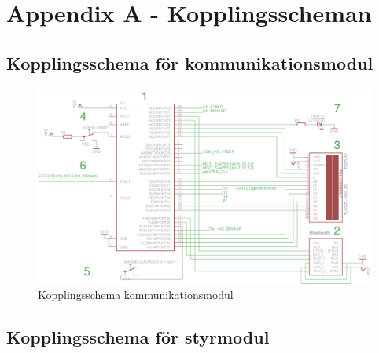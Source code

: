 \documentclass[a4paper,12pt,fleqn]{article}
\begin{document}

\newpage
\appendix
\pagestyle{empty}
\section*{Appendix A - Kopplingsscheman}
\subsection*{Kopplingsschema för kommunikationsmodul}

\begin{figure}[ht] %
  \begin{center}
  \includegraphics[keepaspectratio=true,width=\linewidth]{bilder/Kom_uptodate.png}  %
  \end{center}
  \caption{Kopplingsschema kommunikationsmodul} %
  \label{fig:kopplingkom} %
\end{figure}
 \clearpage %
 

\subsection*{Kopplingsschema för styrmodul}
\end{document}
